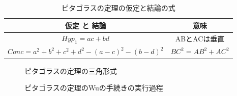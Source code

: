 \documentclass[dvipdfmx]{jsarticle}
\begin{document}
        
        \begin{table}[H]
            \label{table:PythagorasAssumption}
            \centering
            \caption{ピタゴラスの定理の仮定と結論の式}
            \begin{tabular}{cc}
                仮定 と 結論 & 意味\\
                \hline \hline
                $Hyp_{1} = a c + b d$ & ABとACは垂直\\
                $Conc =a^{2} + b^{2} + c^{2} + d^{2} - \left(a - c\right)^{2} - \left(b - d\right)^{2}$ & $BC^2=AB^2+AC^2$ \\
            \end{tabular}
        \end{table}

        \begin{figure}[H]
            \centering
            \label{fig:PythagorasTri}
            \caption{ピタゴラスの定理の三角形式}
        \end{figure}

        \begin{figure}[H]
            \centering
            \label{fig:PythagorasWu}
            \caption{ピタゴラスの定理のWuの手続きの実行過程}            
        \end{figure}
    \clearpage
\end{document}

